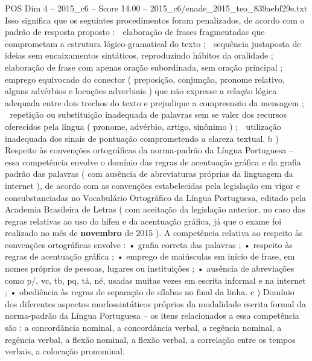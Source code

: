 \begin{textsample}{POS Dim 4 – 2015\_c6 – Score 14.00 – 2015\_c6/enade\_2015\_teo\_839aebf29e.txt}
Isso significa que os seguintes procedimentos foram penalizados, de acordo com o padrão de resposta proposto :  elaboração de frases fragmentadas que comprometam a estrutura lógico-gramatical do texto ;  sequência justaposta de ideias sem encaixamentos sintáticos, reproduzindo hábitos da oralidade ;  elaboração de frase com apenas oração subordinada, sem oração principal ;  emprego equivocado do conector ( preposição, conjunção, pronome relativo, alguns advérbios e locuções adverbiais ) que não expresse a relação lógica adequada entre dois trechos do texto e prejudique a compreensão da mensagem ;  repetição ou substituição inadequada de palavras sem se valer dos recursos oferecidos pela língua ( pronome, advérbio, artigo, sinônimo ) ;  utilização inadequada dos sinais de pontuação comprometendo a clareza textual. b ) Respeito às convenções ortográficas da norma-padrão da Língua Portuguesa – essa competência envolve o domínio das regras de acentuação gráfica e da grafia padrão das palavras ( com ausência de abreviaturas próprias da linguagem da internet ), de acordo com as convenções estabelecidas pela legislação em vigor e consubstanciadas no Vocabulário Ortográfico da Língua Portuguesa, editado pela Academia Brasileira de Letras ( com aceitação da legislação anterior, no caso das regras relativas ao uso do hífen e da acentuação gráfica, já que o exame foi realizado no mês de \textbf{novembro} de 2015 ).
A competência relativa ao respeito às convenções ortográficas envolve : • grafia correta das palavras ; • respeito às regras de acentuação gráfica ; • emprego de maiúsculas em início de frase, em nomes próprios de pessoas, lugares ou instituições ; • ausência de abreviações como p/, vc, tb, pq, tá, né, usadas muitas vezes em escrita informal e na internet ; • obediência às regras de separação de sílabas no final da linha. c ) Domínio dos diferentes aspectos morfossintáticos próprios da modalidade escrita formal da norma-padrão da Língua Portuguesa – os itens relacionados a essa competência são : a concordância nominal, a concordância verbal, a regência nominal, a regência verbal, a flexão nominal, a flexão verbal, a correlação entre os tempos verbais, a colocação pronominal.

\end{textsample}
